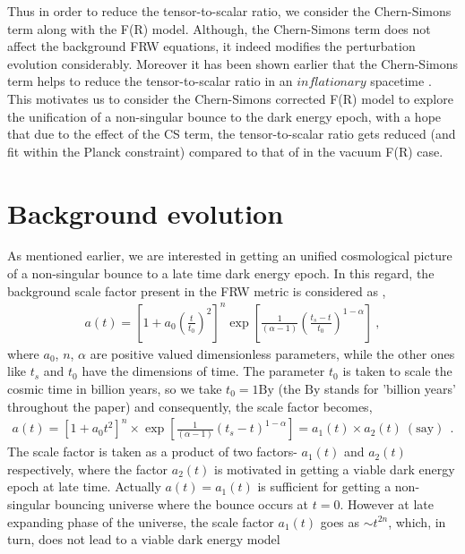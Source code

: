\documentclass{article}
\begin{document}
Thus in order to reduce the tensor-to-scalar ratio, we consider the Chern-Simons term along with the F(R) model. Although, the Chern-Simons 
term does not affect the background FRW equations, it indeed modifies the perturbation evolution considerably. Moreover it has been shown earlier that 
the Chern-Simons term helps to reduce the tensor-to-scalar ratio  in an $inflationary$ spacetime \cite{Odintsov:2019mlf}. 
This motivates us to consider the Chern-Simons corrected F(R) model to explore the unification of a non-singular bounce to the dark energy epoch, 
with a hope that due to the effect of the CS term, the tensor-to-scalar ratio gets reduced (and fit within the Planck constraint) 
compared to that of in the vacuum F(R) case.

\section{Background evolution}\label{sec-background}
As mentioned earlier, we are interested in getting an unified cosmological picture of a non-singular bounce to a late time 
dark energy epoch. In this regard, the background scale factor present in the FRW metric is considered as \cite{Odintsov:2016tar},
\begin{eqnarray}
 a(t) = \left[1 + a_0\left(\frac{t}{t_0}\right)^2\right]^n\exp{\left[\frac{1}{(\alpha-1)}\left(\frac{t_s - t}{t_0}\right)^{1-\alpha}\right]}~,
 \label{scale factor1}
\end{eqnarray}
where $a_0$, $n$, $\alpha$ are positive valued dimensionless parameters, 
while the other ones like $t_s$ and $t_0$ have the dimensions of time. The parameter 
$t_0$ is taken to scale the cosmic time in billion years, so we take $t_0 = 1\mathrm{By}$ (the $\mathrm{By}$ stands for 'billion years' 
throughout the paper) and consequently, the scale factor becomes, 
\begin{eqnarray}
 a(t) = \left[1 + a_0t^2\right]^n\times \exp{\left[\frac{1}{(\alpha-1)}\left(t_s - t\right)^{1-\alpha}\right]} = a_1(t)\times a_2(t)~(\mathrm{say})~~.
 \label{scale factor2}
\end{eqnarray}
The scale factor is taken as a product of two factors- $a_1(t)$ and $a_2(t)$ respectively, where the factor $a_2(t)$ is motivated 
in getting a viable dark energy epoch at late time. Actually 
$a(t) = a_1(t)$ is sufficient for getting a non-singular bouncing universe where the bounce occurs at $t = 0$. However 
at late expanding phase of the universe, the scale factor $a_1(t)$ goes as $\sim t^{2n}$, which, in turn, does not lead to a viable dark energy model 
\end{document}
